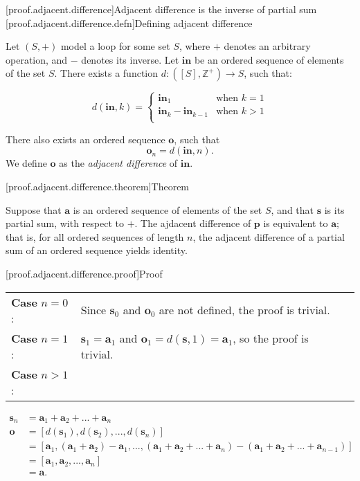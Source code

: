 [proof.adjacent.difference]{Adjacent difference is the inverse of partial sum}
[proof.adjacent.difference.defn]{Defining adjacent difference}

Let $(S, +)$ model a loop for some set $S$, where $+$ denotes an arbitrary operation, and $-$
denotes its inverse. Let $\mathbf{in}$ be an ordered sequence of elements of the set $S$. There
exists a function $d: ([S], \mathbb{Z}^+) \rightarrow S$, such that:

$$d(\mathbf{in}, k) =
   \begin{cases}
      \mathbf{in}_1 & \text{when } k = 1 \\
      \mathbf{in}_k - \mathbf{in}_{k - 1} & \text{when } k > 1 \\
   \end{cases}
$$

There also exists an ordered sequence $\mathbf{o}$, such that $$\mathbf{o}_n = d(\mathbf{in}, n).$$
We define $\mathbf{o}$ as the \textit{adjacent difference} of $\mathbf{in}$.

[proof.adjacent.difference.theorem]{Theorem}

Suppose that $\mathbf{a}$ is an ordered sequence of elements of the set $S$, and that $\mathbf{s}$
is its partial sum, with respect to $+$. The ajdacent difference of $\mathbf{p}$ is equivalent to
$\textbf{a}$; that is, for all ordered sequences of length $n$, the adjacent difference of a partial
sum of an ordered sequence yields identity.

[proof.adjacent.difference.proof]{Proof}

\begin{tabular}{lll}
   \textbf{Case} $n = 0$: & Since $\mathbf{s}_0$ and $\mathbf{o}_0$ are not defined, the proof is
                           trivial.\\
   \textbf{Case} $n = 1$: & $\textbf{s}_1 = \mathbf{a}_1$ and $\mathbf{o}_1 = d(\mathbf{s}, 1) =
                           \mathbf{a}_1$, so the proof is trivial.\\
   \textbf{Case} $n > 1$: & \\
\end{tabular}
\begin{align}
   \mathbf{s}_n &= \mathbf{a}_1 + \mathbf{a}_2 + ... + \mathbf{a}_n\\
   \mathbf{o} &= [d(\mathbf{s}_1), d(\mathbf{s}_2), ..., d(\mathbf{s}_n)]\\
              &= [\mathbf{a}_1,
                  (\mathbf{a}_1 + \mathbf{a}_2) - \mathbf{a}_1,
                  ...,
                  (\mathbf{a}_1 + \mathbf{a}_2 + ... + \mathbf{a}_n) -
                     (\mathbf{a}_1 + \mathbf{a}_2 + ... + \mathbf{a}_{n - 1})]\\
              &= [\mathbf{a}_1, \mathbf{a}_2, ..., \mathbf{a}_n]\\
              &= \mathbf{a}.
\end{align}

